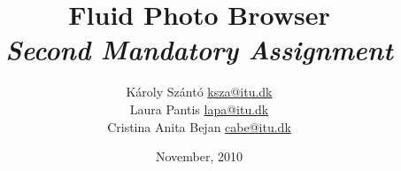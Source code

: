 \documentclass[10pt, a4paper]{article}
\title{Fluid Photo Browser \\ \emph{Second Mandatory Assignment}}
\author{
K\'aroly Sz\'ant\'o \href{mailto:ksza@itu.dk}{ksza@itu.dk}\\
Laura Pantis \href{mailto:lapa@itu.dk}{lapa@itu.dk}\\
Cristina Anita Bejan \href{mailto:cabe@itu.dk}{cabe@itu.dk}
}
\date{November, 2010}
\begin{document}
\maketitle{}









%
%
\end{document}
